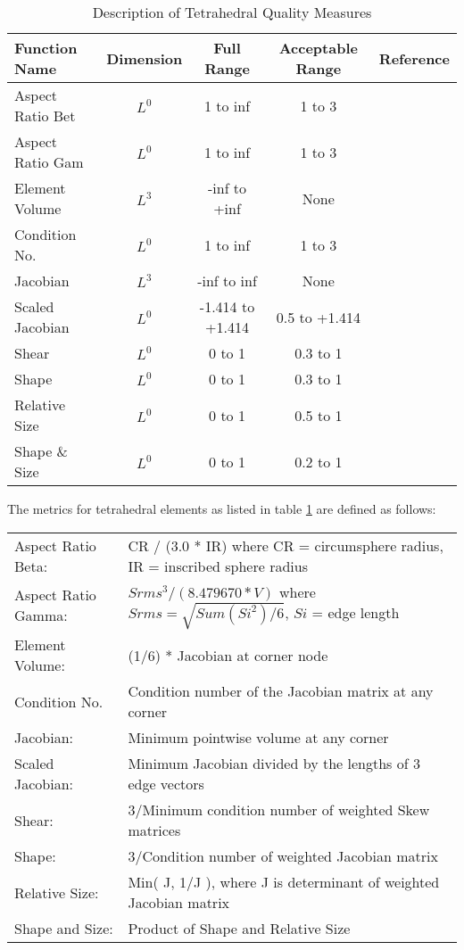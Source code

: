 \documentclass[10pt]{report}
\begin{document}
\begin{appendix}
\begin{table}[h]
\begin{center}
\begin{tabular}{|l|c|c|c|c|}
\hline
Function Name   & Dimension & Full Range &Acceptable Range &  Reference \\
\hline
Aspect Ratio Bet  & $L^0$ &     1 to inf   &   1 to 3      & \cite{parth} \\
Aspect Ratio Gam  & $L^0$ &     1 to inf   &   1 to 3      & \cite{parth} \\
Element Volume    & $L^3$ &  -inf to +inf  &    None       & \cite{parth} \\
Condition No.     & $L^0$ &     1 to inf   &   1 to 3      & \cite{knupp2000} \\
Jacobian          & $L^3$ &  -inf to inf   &    None       & \cite{knupp2000} \\
Scaled Jacobian   & $L^0$ &-1.414 to +1.414& 0.5 to +1.414 & \cite{knupp2000} \\
Shear             & $L^0$ &     0 to 1     & 0.3 to 1      & \cite{knupp2002} \\
Shape             & $L^0$ &     0 to 1     & 0.3 to 1      & \cite{knupp2002} \\
Relative Size     & $L^0$ &     0 to 1     & 0.5 to 1      & \cite{knupp2002} \\
Shape \& Size     & $L^0$ &     0 to 1     & 0.2 to 1      & \cite{knupp2002} \\
\hline
\end{tabular}
\end{center}
\T\caption{Description of Tetrahedral Quality Measures}
\label{tab:tet}
\end{table}

The metrics for tetrahedral elements as listed in table 
\ref{tab:tet} are defined as follows:
\T\bigskip
\htmlrule

\begin{tabular}{lp{4in}}
Aspect Ratio Beta: & CR / (3.0 * IR)  where CR = circumsphere radius, IR = inscribed sphere radius \\
Aspect Ratio Gamma:& $Srms^3 / (8.479670*V)$  where $Srms = \sqrt{Sum(Si^2)/6}$, $Si$ = edge length \\
Element Volume:    & (1/6) * Jacobian at corner node \\
Condition No.      & Condition number of the Jacobian matrix at any corner \\
Jacobian:          & Minimum pointwise volume at any corner \\
Scaled Jacobian:   & Minimum Jacobian divided by the lengths of 3 edge vectors \\
Shear:             & 3/Minimum condition number of weighted Skew matrices \\
Shape:             & 3/Condition number of weighted Jacobian matrix \\
Relative Size:     & Min( J, 1/J ), where J is determinant of weighted Jacobian matrix \\
Shape and Size:    & Product of Shape and Relative Size \\
\end{tabular}
\T\newpage
\htmlrule


\end{appendix}
\end{document}
